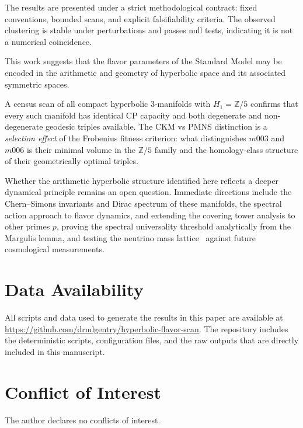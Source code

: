 ﻿\documentclass[12pt]{article}
\theoremstyle{definition}
\begin{document}
The results are presented under a strict methodological contract: fixed conventions, bounded scans, and explicit falsifiability criteria. The observed clustering is stable under perturbations and passes null tests, indicating it is not a numerical coincidence.

This work suggests that the flavor parameters of the Standard Model may be encoded in the arithmetic and geometry of hyperbolic space and its associated symmetric spaces.

A census scan of all compact hyperbolic 3-manifolds with $H_1=\mathbb{Z}/5$ confirms that every such manifold has identical CP capacity and both degenerate and non-degenerate geodesic triples available. The CKM vs PMNS distinction is a \emph{selection effect} of the Frobenius fitness criterion: what distinguishes $m003$ and $m006$ is their minimal volume in the $\mathbb{Z}/5$ family and the homology-class structure of their geometrically optimal triples.

Whether the arithmetic hyperbolic structure identified here reflects a deeper dynamical principle remains an open question. Immediate directions include the Chern--Simons invariants and Dirac spectrum of these manifolds, the spectral action approach to flavor dynamics, and extending the covering tower analysis to other primes $p$,
proving the spectral universality threshold analytically from
the Margulis lemma, and testing the neutrino mass lattice~\cite{Gentry:neutrino} against future cosmological measurements.

\section*{Data Availability}
All scripts and data used to generate the results in this paper are available at \url{https://github.com/drmlgentry/hyperbolic-flavor-scan}. The repository includes the deterministic scripts, configuration files, and the raw outputs that are directly included in this manuscript.

\section*{Conflict of Interest}
The author declares no conflicts of interest.
\end{document}
